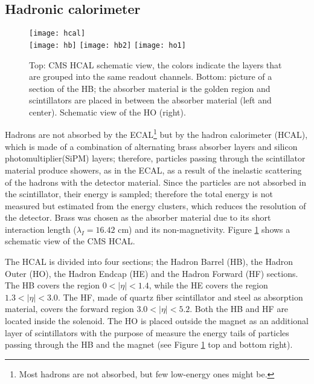 \subsection{Hadronic calorimeter}

\begin{figure}[h!]
  \centering
  \texttt{[image: hcal]}\\
  \texttt{[image: hb]}
  \texttt{[image: hb2]}
  \texttt{[image: ho1]} 
  \caption[CMS HCAL schematic view]{Top: CMS HCAL schematic view, the colors indicate the layers that are grouped into the same readout channels. Bottom: picture of a section of the HB; the absorber material is the golden region and scintillators are placed in between the absorber material (left and center). Schematic view of the HO (right). \cite{hcal,hb} }
  \label{fig:hcal}
\end{figure}

Hadrons are not absorbed by the ECAL\footnote{Most hadrons are not absorbed, but few low-energy ones might be.} but by the hadron calorimeter (HCAL), which is made of a combination of alternating brass absorber layers and silicon photomultiplier(SiPM) layers; therefore, particles passing through the scintillator material produce showers, as in the ECAL, as a result of the inelastic scattering of the hadrons with the detector material. Since the particles are not absorbed in the scintillator, their energy is sampled; therefore the total energy is not measured but estimated from the energy clusters, which reduces the resolution of the detector. Brass was chosen as the absorber material due to its short interaction length ($\lambda_I=16.42$ cm) and its non-magnetivity. Figure \ref{fig:hcal} shows a schematic view of the CMS HCAL.

The HCAL is divided into four sections; the Hadron Barrel (HB), the Hadron Outer (HO), the Hadron Endcap (HE) and the Hadron Forward (HF) sections. The HB covers the region $0<|\eta|<1.4$, while the HE covers the region $1.3<|\eta|<3.0$. The HF, made of quartz fiber scintillator and steel as absorption material, covers the forward region $3.0<|\eta|<5.2$. Both the HB and HF are located inside the solenoid. The HO is placed outside the magnet as an additional layer of scintillators with the purpose of measure the energy tails of particles passing through the HB and the magnet (see Figure \ref{fig:hcal} top and bottom right).%


